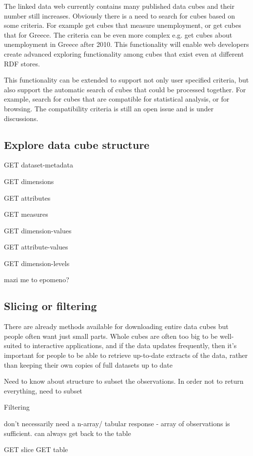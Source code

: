\documentclass{llncs}
\begin{document}
The linked data web currently contains many published data cubes and their number still increases. Obviously there is a need to search for cubes based on some criteria. For example get cubes that measure unemployment, or get cubes that for Greece. The criteria can be even more complex e.g. get cubes about unemployment in Greece after 2010. This functionality will enable web developers create advanced exploring functionality among cubes that exist even at different RDF stores.

This functionality can be extended to support not only user specified criteria, but also support the automatic search of cubes that could be processed together. For example, search for cubes that are compatible for statistical analysis, or for browsing. The compatibility criteria is still an open issue and is under discussions.

\subsection{Explore data cube structure}
GET dataset-metadata

GET dimensions

GET attributes

GET measures

GET dimension-values

GET attribute-values

GET dimension-levels

mazi me to epomeno?


\subsection{Slicing or filtering}
There are already methods available for downloading entire data cubes but people often want just small parts.  Whole cubes are often too big to be well-suited to interactive applications, and if the data updates frequently,  then it's important for people to be able to retrieve up-to-date extracts of the data, rather than keeping their own copies of full datasets up to date

Need to know about structure to subset the observations. In order not to return everything, need to subset

Filtering

don't necessarily need a n-array/ tabular response - array of observations is sufficient. can always get back to the table

GET slice
GET table
\end{document}
